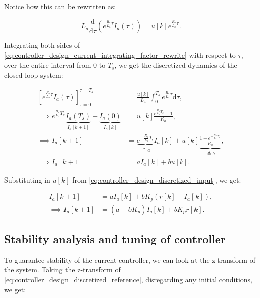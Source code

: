 Notice how this can be rewritten as:

\begin{equation}
    \label{eq:controller_design_current_integrating_factor_rewrite}
    L_a \frac{\mathrm{d}}{\mathrm{d}\tau} \left(e^{\frac{R_a}{L_a} \tau} I_a(\tau)\right) = u[k] e^{\frac{R_a}{L_a} \tau}.
\end{equation}

Integrating both sides of \cref{eq:controller_design_current_integrating_factor_rewrite} with respect to $\tau$, over the entire interval from $0$ to $T_s$, we get the discretized dynamics of the closed-loop system:

\begin{equation}
    \label{eq:controller_design_discretized}
    \begin{aligned}
        \left[e^{\frac{R_a}{L_a} \tau} I_a(\tau)\right]_{\tau = 0}^{\tau = T_s} &= \frac{u[k]}{L_a} \int_0^{T_s} e^{\frac{R_a}{L_a} \tau} \mathrm{d}\tau,\\
        \implies e^{\frac{R_a}{L_a} T_s} \underbrace{I_a(T_s)}_{I_a[k+1]} - \underbrace{I_a(0)}_{I_a[k]} &= u[k] \frac{e^{\frac{R_a}{L_a} T_s} - 1}{R_a},\\
        \implies I_a[k+1] &= \underbrace{e^{-\frac{R_a}{L_a} T_s}}_{\triangleq a} I_a[k] + u[k] \underbrace{\frac{1 - e^{-\frac{R_a}{L_a} T_s}}{R_a}}_{\triangleq b},\\
        \implies I_a[k+1] &= a I_a[k] + b u[k].
    \end{aligned}
\end{equation}

Substituting in $u[k]$ from \cref{eq:controller_design_discretized_input}, we get:

\begin{equation}
    \label{eq:controller_design_discretized_reference}
    \begin{aligned}
        I_a[k+1] &= a I_a[k] + b K_p (r[k] - I_a[k]),\\
        \implies I_a[k+1] &= \left(a - b K_p\right) I_a[k] + b K_p r[k].
    \end{aligned}
\end{equation}



\subsection{Stability analysis and tuning of controller}

To guarantee stability of the current controller, we can look at the z-transform of the system. Taking the z-transform of \cref{eq:controller_design_discretized_reference}, disregarding any initial conditions, we get:

